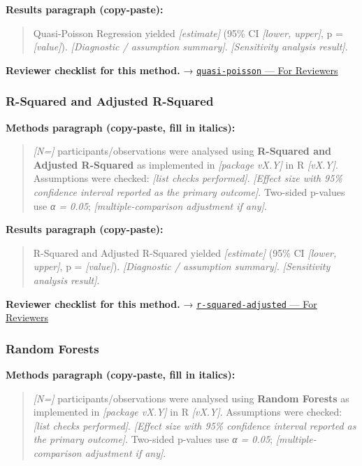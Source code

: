 \documentclass[
]{article}
\begin{document}
\textbf{Results paragraph (copy-paste):}

\begin{quote}
Quasi-Poisson Regression yielded \emph{{[}estimate{]}} (95\% CI
\emph{{[}lower, upper{]}}, p = \emph{{[}value{]}}). \emph{{[}Diagnostic
/ assumption summary{]}}. \emph{{[}Sensitivity analysis result{]}}.
\end{quote}

\textbf{Reviewer checklist for this method.} →
\href{../chapters/07-regression/quasi-poisson.Rmd\#for-reviewers}{\texttt{quasi-poisson}
--- For Reviewers}

\subsubsection{R-Squared and Adjusted
R-Squared}\label{r-squared-and-adjusted-r-squared}

\textbf{Methods paragraph (copy-paste, fill in italics):}

\begin{quote}
\emph{{[}N={]}} participants/observations were analysed using
\textbf{R-Squared and Adjusted R-Squared} as implemented in
\emph{{[}package vX.Y{]}} in R \emph{{[}vX.Y{]}}. Assumptions were
checked: \emph{{[}list checks performed{]}}. \emph{{[}Effect size with
95\% confidence interval reported as the primary outcome{]}}. Two-sided
p-values use \emph{α = 0.05}; \emph{{[}multiple-comparison adjustment if
any{]}}.
\end{quote}

\textbf{Results paragraph (copy-paste):}

\begin{quote}
R-Squared and Adjusted R-Squared yielded \emph{{[}estimate{]}} (95\% CI
\emph{{[}lower, upper{]}}, p = \emph{{[}value{]}}). \emph{{[}Diagnostic
/ assumption summary{]}}. \emph{{[}Sensitivity analysis result{]}}.
\end{quote}

\textbf{Reviewer checklist for this method.} →
\href{../chapters/07-regression/r-squared-adjusted.Rmd\#for-reviewers}{\texttt{r-squared-adjusted}
--- For Reviewers}

\subsubsection{Random Forests}\label{random-forests}

\textbf{Methods paragraph (copy-paste, fill in italics):}

\begin{quote}
\emph{{[}N={]}} participants/observations were analysed using
\textbf{Random Forests} as implemented in \emph{{[}package vX.Y{]}} in R
\emph{{[}vX.Y{]}}. Assumptions were checked: \emph{{[}list checks
performed{]}}. \emph{{[}Effect size with 95\% confidence interval
reported as the primary outcome{]}}. Two-sided p-values use \emph{α =
0.05}; \emph{{[}multiple-comparison adjustment if any{]}}.
\end{quote}
\end{document}
